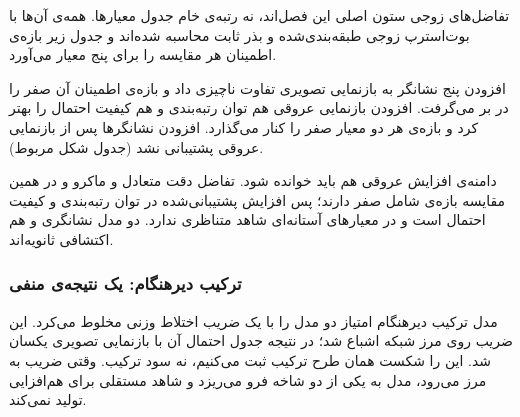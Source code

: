 تفاضل‌های زوجی ستون اصلی این فصل‌اند، نه رتبه‌ی خام جدول معیارها. همه‌ی آن‌ها با بوت‌استرپ زوجی طبقه‌بندی‌شده و بذر ثابت محاسبه شده‌اند و جدول زیر بازه‌ی اطمینان هر مقایسه را برای پنج معیار می‌آورد.



افزودن پنج نشانگر به بازنمایی تصویری تفاوت ناچیزی داد و بازه‌ی اطمینان آن صفر را در بر می‌گرفت. افزودن بازنمایی عروقی هم توان رتبه‌بندی و هم کیفیت احتمال را بهتر کرد و بازه‌ی هر دو معیار صفر را کنار می‌گذارد. افزودن نشانگرها پس از بازنمایی عروقی پشتیبانی نشد (جدول شکل مربوط).

دامنه‌ی افزایش عروقی هم باید خوانده شود. تفاضل دقت متعادل و  ماکرو و  در همین مقایسه بازه‌ی شامل صفر دارند؛ پس افزایش پشتیبانی‌شده در توان رتبه‌بندی و کیفیت احتمال است و در معیارهای آستانه‌ای شاهد متناظری ندارد. دو مدل نشانگری  و  هم اکتشافی ثانویه‌اند.



\subsubsection{ترکیب دیرهنگام: یک نتیجه‌ی منفی}

مدل ترکیب دیرهنگام امتیاز دو مدل را با یک ضریب اختلاط وزنی مخلوط می‌کرد. این ضریب روی مرز شبکه اشباع شد؛ در نتیجه جدول احتمال آن با بازنمایی تصویری یکسان شد. این را شکست همان طرح ترکیب ثبت می‌کنیم، نه سود ترکیب. وقتی ضریب به مرز می‌رود، مدل به یکی از دو شاخه فرو می‌ریزد و شاهد مستقلی برای هم‌افزایی تولید نمی‌کند.
